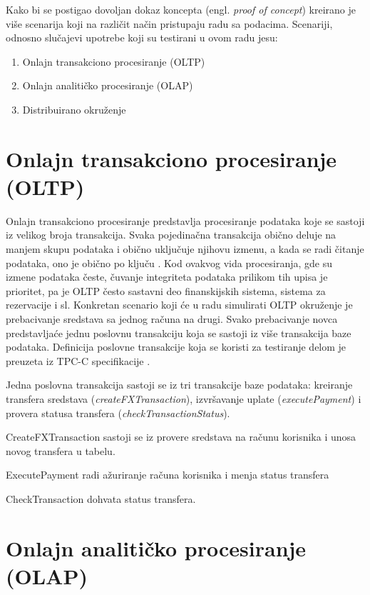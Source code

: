 \documentclass[12pt,oneside]{memoir}
\begin{document}
Kako bi se postigao dovoljan dokaz koncepta (engl. \textit{proof of concept}) kreirano je više scenarija koji na različit način pristupaju radu sa podacima. Scenariji, odnosno slučajevi upotrebe koji su testirani u ovom radu jesu: 
\begin{enumerate}
\item Onlajn transakciono procesiranje (OLTP)
\item Onlajn analitičko procesiranje (OLAP)
\item Distribuirano okruženje
\end{enumerate}


\section{Onlajn transakciono procesiranje (OLTP)}
Onlajn transakciono procesiranje predstavlja procesiranje podataka koje se sastoji iz velikog broja transakcija.  Svaka pojedinačna transakcija obično deluje na manjem skupu podataka i obično uključuje njihovu izmenu, a kada se radi čitanje podataka, ono je obično po ključu \cite{oltp}. Kod ovakvog vida procesiranja, gde su izmene podataka česte, čuvanje integriteta podataka prilikom tih upisa je prioritet, pa je OLTP često sastavni deo finanskijskih sistema, sistema za rezervacije i sl.
Konkretan scenario koji će u radu simulirati OLTP okruženje je prebacivanje sredstava sa jednog računa na drugi. Svako prebacivanje novca predstavljaće jednu poslovnu transakciju koja se sastoji iz više transakcija baze podataka. Definicija poslovne transakcije koja se koristi za testiranje delom je preuzeta iz TPC-C specifikacije \cite{tpcc}. 

Jedna poslovna transakcija sastoji se iz tri transakcije baze podataka: kreiranje transfera sredstava (\textit{createFXTransaction}), izvršavanje uplate (\textit{executePayment}) i provera statusa transfera (\textit{checkTransactionStatus}).

CreateFXTransaction sastoji se iz provere sredstava na računu korisnika i unosa novog transfera u tabelu.

ExecutePayment radi ažuriranje računa korisnika i menja status transfera

CheckTransaction dohvata status transfera.

\section{Onlajn analitičko procesiranje (OLAP)}
\end{document}
